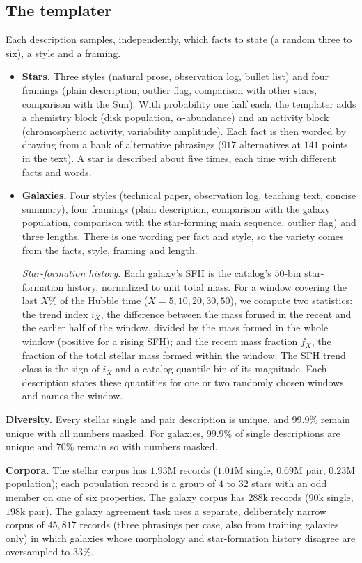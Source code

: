 \subsection{The templater}\label{app:templater}
Each description samples, independently, which facts to state (a random three to
six), a style and a framing.
\begin{itemize}
\item \textbf{Stars.} Three styles (natural prose, observation log, bullet list)
  and four framings (plain description, outlier flag, comparison with other
  stars, comparison with the Sun). With probability one half each, the
  templater adds a chemistry block (disk population, $\alpha$-abundance) and an
  activity block (chromospheric activity, variability amplitude). Each fact is
  then worded by drawing from a bank of alternative phrasings ($917$
  alternatives at $141$ points in the text). A star is described about five
  times, each time with different facts and words.
\item \textbf{Galaxies.} Four styles (technical paper, observation log, teaching
  text, concise summary), four framings (plain description, comparison with the
  galaxy population, comparison with the star-forming main sequence, outlier
  flag) and three lengths. There is one wording per fact and style, so the
  variety comes from the facts, style, framing and length.

  \emph{Star-formation history.} Each galaxy's SFH is the catalog's $50$-bin
  star-formation history, normalized to unit total mass. For a window covering
  the last $X\%$ of the Hubble time ($X = 5, 10, 20, 30, 50$), we compute two
  statistics: the trend index $i_X$, the difference between the mass formed in
  the recent and the earlier half of the window, divided by the mass formed in
  the whole window (positive for a rising SFH); and the recent mass fraction
  $f_X$, the fraction of the total stellar mass formed within the window. The SFH
  trend class is the sign of $i_X$ and a catalog-quantile bin of its magnitude.
  Each description states these quantities for one or two randomly chosen
  windows and names the window.
\end{itemize}
\textbf{Diversity.} Every stellar single and pair description is unique, and
$99.9\%$ remain unique with all numbers masked. For galaxies, $99.9\%$ of single
descriptions are unique and $70\%$ remain so with numbers masked.

\textbf{Corpora.} The stellar corpus has $1.93$M records ($1.01$M single,
$0.69$M pair, $0.23$M population); each population record is a group of $4$ to
$32$ stars with an odd member on one of six properties. The galaxy corpus has
$288$k records ($90$k single, $198$k pair). The galaxy agreement task uses a
separate, deliberately narrow corpus of $45{,}817$ records (three phrasings per
case, also from training galaxies only) in which galaxies whose morphology and
star-formation history disagree are oversampled to $33\%$.


